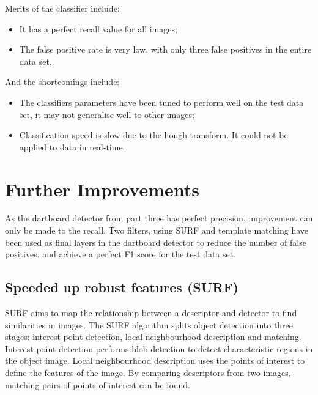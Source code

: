 \documentclass[conference]{IEEEtran}
\begin{document}
Merits of the classifier include: 
\begin{itemize}
	\item It has a perfect recall value for all images;
	\item The false positive rate is very low, with only three false positives in the entire data set.
\end{itemize}
And the shortcomings include:
\begin{itemize}
	\item The classifiers parameters have been tuned to perform well on the test data set, it may not generalise well to other images;
	\item Classification speed is slow due to the hough transform. It could not be applied to data in real-time. 
\end{itemize}




\newpage
\section{Further Improvements}
As the dartboard detector from part three has perfect precision, improvement can only be made to the recall. Two filters, using SURF and template matching have been used as final layers in the dartboard detector to reduce the number of false positives, and achieve a perfect F1 score for the test data set. 
\par
\subsection{Speeded up robust features (SURF)}
SURF aims to map the relationship between a descriptor and detector to find similarities in images. The SURF algorithm splits object detection into three stages: interest point detection, local neighbourhood description and matching. Interest point detection performs blob detection to detect characteristic regions in the object image. Local neighbourhood description uses the points of interest to define the features of the image. By comparing descriptors from two images, matching pairs of points of interest can be found. 
\par
\end{document}
